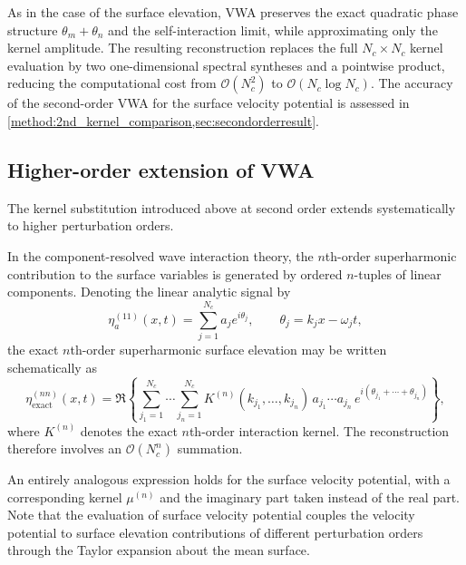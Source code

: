 \documentclass[lineno]{JFM-FLM_Au}
\begin{document}
As in the case of the surface elevation, VWA preserves the exact quadratic phase structure $\theta_m+\theta_n$ and the self-interaction limit, while approximating only the kernel amplitude. 
The resulting reconstruction replaces the full $N_c\times N_c$ kernel evaluation by two one-dimensional spectral syntheses and a pointwise product, reducing the computational cost from $\mathcal{O}(N_c^2)$ to $\mathcal{O}(N_c\log N_c)$. The accuracy of the second-order VWA for the surface velocity potential is assessed in \cref{method:2nd_kernel_comparison,sec:secondorderresult}.


\subsection{Higher-order extension of VWA}
\label{sec:VWA_higher_order_structure}

The kernel substitution introduced above at second order extends systematically to higher perturbation orders.

In the component-resolved wave interaction theory, the $n$th-order superharmonic contribution to the surface variables is generated by ordered $n$-tuples of linear components. 
Denoting the linear analytic signal by
\[
\eta_a^{(11)}(x,t)
=
\sum_{j=1}^{N_c}
a_j e^{i\theta_j},
\qquad
\theta_j = k_j x - \omega_j t,
\]
the exact $n$th-order superharmonic surface elevation may be written schematically as
\begin{equation}\label{eq:exact_nth_structure}
\eta^{(n n)}_{\mathrm{exact}}(x,t)
=
\Re\left\{
\sum_{j_1=1}^{N_c}\cdots\sum_{j_n=1}^{N_c}
K^{(n)}(k_{j_1},\dots,k_{j_n})
\,a_{j_1}\cdots a_{j_n}
\,e^{i(\theta_{j_1}+\cdots+\theta_{j_n})}
\right\},
\end{equation}
where $K^{(n)}$ denotes the exact $n$th-order interaction kernel.
The reconstruction therefore involves an $\mathcal{O}(N_c^n)$ summation.

An entirely analogous expression holds for the surface velocity potential, with a corresponding kernel $\mu^{(n)}$ and the imaginary part taken instead of the real part. Note that the evaluation of surface velocity potential couples the velocity potential to surface elevation contributions of different perturbation orders through the Taylor expansion about the mean surface.
\end{document}
